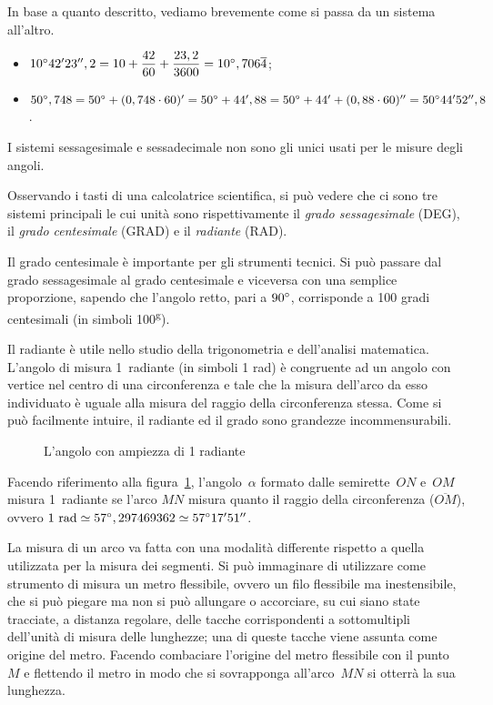 In base a quanto descritto, vediamo brevemente come si passa da un sistema all'altro.

\begin{itemize}
\item $10{}^{\circ} 42' 23'',2 = 10+\dfrac{42}{60}+\dfrac{23,2}{3600} = 10{}^{\circ},706\overline{4}$;
\item $50{}^{\circ},748 = 50{}^{\circ} + (0,748\cdot 60)'=50{}^{\circ} + 44',88 = 50{}^{\circ} + 44'+(0,88\cdot 60)'' = 50{}^{\circ} 44' 52'',8$.
\end{itemize}

I sistemi sessagesimale e sessadecimale non sono gli unici usati per le misure degli angoli.

Osservando i tasti di una calcolatrice scientifica, si può vedere che ci sono tre sistemi principali le cui unità sono rispettivamente il \emph{grado sessagesimale} (DEG), il \emph{grado centesimale} (GRAD) e il \emph{radiante} (RAD).

Il grado centesimale è importante per gli strumenti tecnici. Si può passare dal grado sessagesimale al grado centesimale e viceversa con una semplice proporzione, sapendo che l'angolo retto, pari a $90{}^{\circ}$, corrisponde a 100 gradi centesimali (in simboli 100\textsuperscript{g}).

Il radiante è utile nello studio della trigonometria e dell'analisi matematica. L'angolo di misura 1~radiante (in simboli 1 rad) è congruente ad un angolo con vertice nel centro di una circonferenza e tale che la misura dell'arco da esso individuato è uguale alla misura del raggio della circonferenza stessa. Come si può facilmente intuire, il radiante ed il grado sono grandezze incommensurabili.

\begin{figure}[htb]
\centering
\caption{L'angolo con ampiezza di 1 radiante}\label{fig:radiante}
\end{figure}

Facendo riferimento alla figura~\ref{fig:radiante}, l'angolo~$\alpha$ formato dalle semirette~$ON$ e~$OM$ misura 1~radiante se l'arco $MN$ misura quanto il raggio della circonferenza ($\overline{OM}$), ovvero $1\text{ rad} \simeq 57{}^{\circ},297469362 \simeq 57{}^{\circ} 17'51''$.

La misura di un arco va fatta con una modalità differente rispetto a quella utilizzata per la misura dei segmenti. Si può immaginare di utilizzare come strumento di misura un metro flessibile, ovvero un filo flessibile ma inestensibile, che si può piegare ma non si può allungare o accorciare, su cui siano state tracciate, a distanza regolare, delle tacche corrispondenti a sottomultipli dell'unità di misura delle lunghezze; una di queste tacche viene assunta come origine del metro. Facendo combaciare l'origine del metro flessibile con il punto~$M$ e flettendo il metro in modo che si sovrapponga all'arco~$MN$ si otterrà la sua lunghezza.

